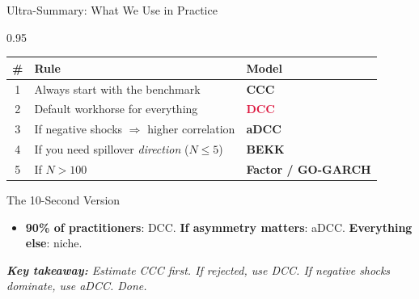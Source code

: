 \documentclass[9pt, aspectratio=169, t]{beamer}
\begin{document}
\begin{frame}{Ultra-Summary: What We Use in Practice}
    \begin{cminipage}{0.95\textwidth}
    \vspace{0.3cm}
    {\footnotesize
    \begin{center}
        \renewcommand{\arraystretch}{1.6}
        \begin{tabular}{@{}cll@{}}
            \toprule
            \textbf{\#} & \textbf{Rule} & \textbf{Model} \\
            \midrule
            1 & Always start with the benchmark & \textcolor{MainBlue}{\textbf{CCC}} \\
            2 & Default workhorse for everything & \textcolor{Crimson}{\textbf{DCC}} \\
            3 & If negative shocks $\Rightarrow$ higher correlation & \textcolor{Forest}{\textbf{aDCC}} \\
            4 & If you need spillover \textit{direction} ($N \leq 5$) & \textbf{BEKK} \\
            5 & If $N > 100$ & \textbf{Factor / GO-GARCH} \\
            \bottomrule
        \end{tabular}
    \end{center}
    \vspace{0.3cm}
    \begin{alertblock}{The 10-Second Version}
        \begin{itemize}\setlength{\itemsep}{0pt}
            \item \textbf{90\% of practitioners}: DCC. \textbf{If asymmetry matters}: aDCC. \textbf{Everything else}: niche.
        \end{itemize}
    \end{alertblock}
    \vspace{0.2cm}
    \textit{\textbf{Key takeaway:} Estimate CCC first. If rejected, use DCC. If negative shocks dominate, use aDCC. Done.}
    }
    \end{cminipage}
\end{frame}

\end{document}
